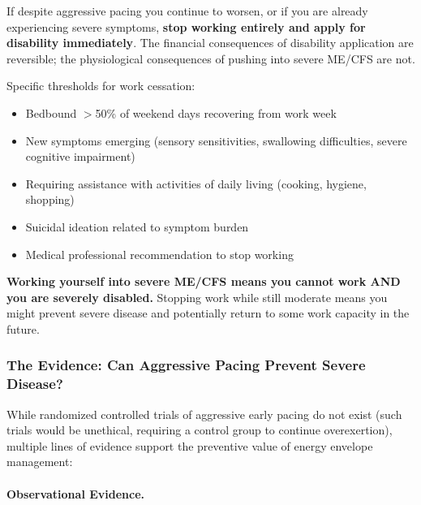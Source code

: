 \begin{warning*}
If despite aggressive pacing you continue to worsen, or if you are already experiencing severe symptoms, \textbf{stop working entirely and apply for disability immediately}. The financial consequences of disability application are reversible; the physiological consequences of pushing into severe ME/CFS are not.

Specific thresholds for work cessation:
\begin{itemize}
    \item Bedbound $>$50\% of weekend days recovering from work week
    \item New symptoms emerging (sensory sensitivities, swallowing difficulties, severe cognitive impairment)
    \item Requiring assistance with activities of daily living (cooking, hygiene, shopping)
    \item Suicidal ideation related to symptom burden
    \item Medical professional recommendation to stop working
\end{itemize}

\textbf{Working yourself into severe ME/CFS means you cannot work AND you are severely disabled.} Stopping work while still moderate means you might prevent severe disease and potentially return to some work capacity in the future.
\end{warning*}

\subsubsection{The Evidence: Can Aggressive Pacing Prevent Severe Disease?}
\label{sec:pacing-prevention-evidence}

While randomized controlled trials of aggressive early pacing do not exist (such trials would be unethical, requiring a control group to continue overexertion), multiple lines of evidence support the preventive value of energy envelope management:

\paragraph{Observational Evidence.}

